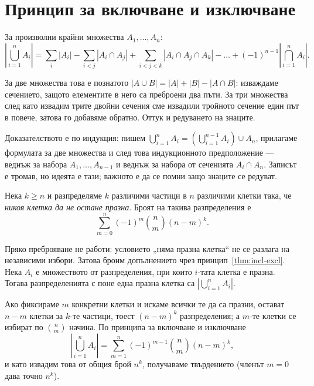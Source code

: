 \section{Принцип за включване и изключване}

\begin{keythm}\label{thm:incl-excl}
За произволни крайни множества $A_1, \dots, A_n$:
\[
\left| \bigcup_{i=1}^{n} A_i \right|
 = \sum_{i} |A_i|
 - \sum_{i<j} |A_i \cap A_j|
 + \sum_{i<j<k} |A_i \cap A_j \cap A_k|
 - \dots
 + (-1)^{n-1} \left| \bigcap_{i=1}^{n} A_i \right| .
\]
\end{keythm}

За две множества това е познатото $|A \cup B| = |A| + |B| - |A \cap B|$: изваждаме
сечението, защото елементите в него са преброени два пъти. За три множества след като
извадим трите двойни сечения сме извадили тройното сечение един път в повече, затова го
добавяме обратно. Оттук и редуването на знаците.

Доказателството е по индукция: пишем $\bigcup_{i=1}^{n} A_i = \left(\bigcup_{i=1}^{n-1} A_i\right) \cup A_n$,
прилагаме формулата за две множества и след това индукционното предположение — веднъж за
набора $A_1, \dots, A_{n-1}$ и веднъж за набора от сеченията $A_i \cap A_n$. Записът е
тромав, но идеята е тази; важното е да се помни защо знаците се редуват.

\begin{example}\label{ex:15-surj}
Нека $k \ge n$ и разпределяме $k$ различими частици в $n$ различими клетки така, че
\emph{никоя клетка да не остане празна}. Броят на такива разпределения е
\[
\sum_{m=0}^{n} (-1)^m \binom{n}{m} (n-m)^k .
\]

Пряко преброяване не работи: условието „няма празна клетка“ не се разлага на независими
избори. Затова броим допълнението чрез принцип~\ref{thm:incl-excl}. Нека
$A_i$ е множеството от разпределения, при които $i$-тата клетка е празна. Тогава
разпределенията с поне една празна клетка са $\left| \bigcup_{i=1}^n A_i \right|$.

Ако фиксираме $m$ конкретни клетки и искаме всички те да са празни, остават $n-m$ клетки за
$k$-те частици, тоест $(n-m)^k$ разпределения; а $m$-те клетки се избират по
$\binom{n}{m}$ начина. По принципа за включване и изключване
\[
\left| \bigcup_{i=1}^n A_i \right| = \sum_{m=1}^{n} (-1)^{m-1} \binom{n}{m} (n-m)^k ,
\]
и като извадим това от общия брой $n^k$, получаваме твърдението (членът $m=0$ дава точно
$n^k$).
\end{example}

